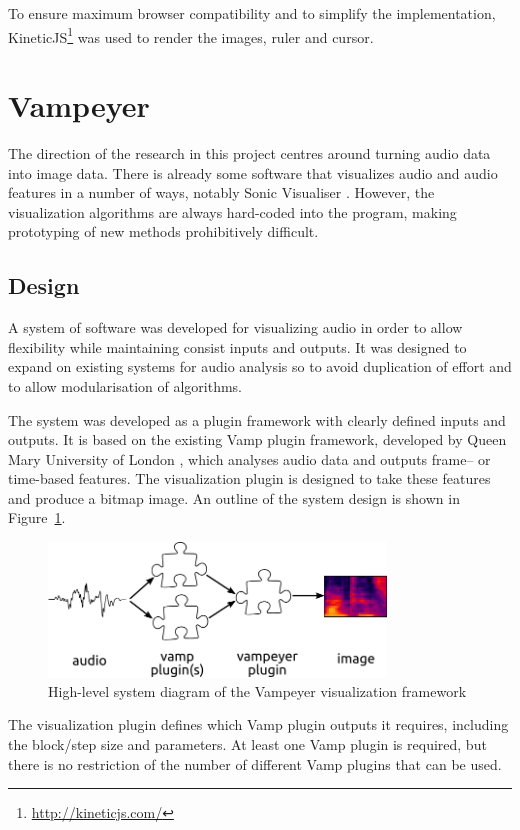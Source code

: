 To ensure maximum browser compatibility and to simplify the implementation,
KineticJS\footnote{\url{http://kineticjs.com/}} was used to render the images, ruler and cursor.

\clearpage
\section{Vampeyer}\label{sec:vampeyer}
The direction of the research in this project centres around turning audio data into image data. There is already some
software that visualizes audio and audio features in a number of ways, notably Sonic Visualiser \citep{Cannam2010}.
However, the visualization algorithms are always hard-coded into the program, making prototyping of new methods
prohibitively difficult.

\subsection{Design}
A system of software was developed for visualizing audio in order to allow flexibility while maintaining consist inputs
and outputs. It was designed to expand on existing systems for audio analysis so to avoid duplication of effort and to
allow modularisation of algorithms.

The system was developed as a plugin framework with clearly defined inputs and outputs. It is based on the existing
Vamp plugin framework, developed by Queen Mary University of London \citep{Cannam2010}, which analyses audio data and
outputs frame-- or time-based features. The visualization plugin is designed to take these features and produce a
bitmap image. An outline of the system design is shown in Figure~\ref{fig:vampeyer}.

\begin{figure}[ht]
  \centering
  \includegraphics[width=0.8\textwidth]{figs/vampeyer.png}
  \caption{High-level system diagram of the Vampeyer visualization framework}
  \label{fig:vampeyer}
\end{figure}

The visualization plugin defines which Vamp plugin outputs it requires, including the block/step size and parameters.
At least one Vamp plugin is required, but there is no restriction of the number of different Vamp plugins that can be
used.

